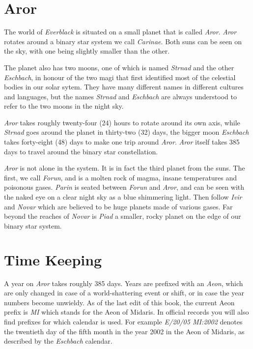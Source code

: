 \twocolumn
\section*{Aror}

The world of \emph{Everblack} is situated on a small planet that is
called \emph{Aror}. \emph{Aror} rotates around a binary star system we
call \emph{Carinae}. Both suns can be seen on the sky, with one being
slightly smaller than the other.

The planet also has two moons, one of which is named \emph{Strnad} and
the other \emph{Eschbach}, in honour of the two magi that first
identified most of the celestial bodies in our solar sytem. They have
many different names in different cultures and languages, but the
names \emph{Strnad} and \emph{Eschbach} are always understood to refer
to the two moons in the night sky.

\emph{Aror} takes roughly twenty-four (24) hours to rotate around its
own axis, while \emph{Strnad} goes around the planet in thirty-two
(32) days, the bigger moon \emph{Eschbach} takes forty-eight (48) days
to make one trip around \emph{Aror}. \emph{Aror} itself takes 385 days
to travel around the binary star constellation.

\emph{Aror} is not alone in the system. It is in fact the third planet
from the suns. The first, we call \emph{Forun}, and is a molten rock
of magma, insane temperatures and poisonous gases. \emph{Parin} is
seated between \emph{Forun} and \emph{Aror}, and can be seen with the
naked eye on a clear night sky as a blue shimmering light. Then follow
\emph{Ivir} and \emph{Novar} which are believed to be huge planets made
of various gases. Far beyond the reaches of \emph{Novar} is
\emph{Piad} a smaller, rocky planet on the edge of our binary star
system.

\section*{Time Keeping}

A year on \emph{Aror} takes roughly 385 days. Years are prefixed with an
\emph{Aeon}, which are only changed in case of a world-shattering event
or shift, or in case the year numbers become unwieldy. As of the last
edit of this book, the current Aeon prefix is \emph{MI} which stands for
the Aeon of Midaris. In official records you will also find prefixes for
which calendar is used. For example \emph{E/20/05 MI:2002} denotes the
twentieth day of the fifth month in the year 2002 in the Aeon of
Midaris, as described by the \emph{Eschbach} calendar.

